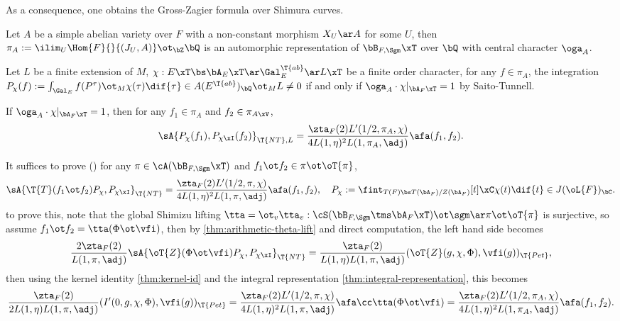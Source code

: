 \documentclass[article, a4paper, twoside]{universal}
\begin{document}
\begin{rmk}
    As a consequence, one obtains the Gross-Zagier formula over Shimura curves.
\end{rmk}

\begin{stp}
    Let $A$ be a simple abelian variety over $F$ with a non-constant morphism $X_{U}\ar A$ for some $U$, then $\pi_{A}:=\ilim_{U}\Hom{F}{}{(J_{U},A)}\ot_{\bZ}\bQ$ is an automorphic representation of $\bB_{F,\Sgm}\xT$ over $\bQ$ with central character $\oga_{A}$.

    Let $L$ be a finite extension of $M$, $\chi:E\xT\bs\bA_{E}\xT\ar\Gal_{E}^{\T{ab}}\ar L\xT$ be a finite order character, for any $f\in\pi_{A}$, the integration $P_{\chi}(f):=\int_{\Gal_{E}}f(P^{\tau})\ot_{M}\chi(\tau)\dif{\tau}\in A(E^{\T{ab}})_{\bQ}\ot_{M}L\neq 0$ if and only if $\oga_{A}\cdot\chi|_{\bA_{F}\xT}=1$ by Saito-Tunnell.
\end{stp}


\begin{thm}
    If $\oga_{A}\cdot\chi|_{\bA_{F}\xT}=1$, then for any $f_{1}\in\pi_{A}$ and $f_{2}\in\pi_{A\xV}$,
    \[
        \sA{P_{\chi}(f_{1}),P_{\chi\xI}(f_{2})}_{\T{NT},L}=\frac{\zta_{F}(2)L'(1/2,\pi_{A},\chi)}{4L(1,\eta)^{2}L(1,\pi_{A},\adj)}\afa(f_{1},f_{2}).
    \]
\end{thm}

\begin{prf}
    It suffices to prove (\cite[Theorem~3.15]{YZZ2013}) for any $\pi\in\cA(\bB_{F,\Sgm}\xT)$ and $f_{1}\ot f_{2}\in\pi\ot\oT{\pi}$,
    \[
        \sA{\T{T}(f_{1}\ot f_{2})P_{\chi},P_{\chi\xI}}_{\T{NT}}=\frac{\zta_{F}(2)L'(1/2,\pi,\chi)}{4L(1,\eta)^{2}L(1,\pi,\adj)}\afa(f_{1},f_{2}),\quad P_{\chi}:=\fint_{T(F)\bs T(\bA_{F})/Z(\bA_{F})}[t]\xC\chi(t)\dif{t}\in J(\oL{F})_{\bC}.
    \]
    to prove this, note that the global Shimizu lifting $\tta=\ot_{v}\tta_{v}:\cS(\bB_{F,\Sgm}\tms\bA_{F}\xT)\ot\sgm\ar\pi\ot\oT{\pi}$ is surjective, so assume $f_{1}\ot f_{2}=\tta(\Phi\ot\vfi)$, then by \cref{thm:arithmetic-theta-lift} and direct computation, the left hand side becomes
    \[
        \frac{2\zta_{F}(2)}{L(1,\pi,\adj)}\sA{\oT{Z}(\Phi\ot\vfi)P_{\chi},P_{\chi\xI}}_{\T{NT}}=\frac{\zta_{F}(2)}{L(1,\eta)L(1,\pi,\adj)}(\oT{Z}(g,\chi,\Phi),\vfi(g))_{\T{Pet}},
    \]
    then using the kernel identity \cref{thm:kernel-id} and the integral representation \cref{thm:integral-representation}, this becomes
    \[
        \frac{\zta_{F}(2)}{2L(1,\eta)L(1,\pi,\adj)}(I'(0,g,\chi,\Phi),\vfi(g))_{\T{Pet}}=\frac{\zta_{F}(2)L'(1/2,\pi,\chi)}{4L(1,\eta)^{2}L(1,\pi,\adj)}\afa\cc\tta(\Phi\ot\vfi)=\frac{\zta_{F}(2)L'(1/2,\pi_{A},\chi)}{4L(1,\eta)^{2}L(1,\pi_{A},\adj)}\afa(f_{1},f_{2}).
    \]
\end{prf}
\end{document}
